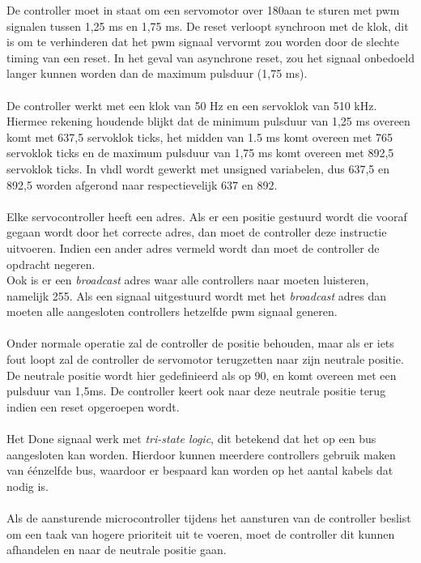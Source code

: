 De controller moet in staat om een servomotor over 180\textdegree  aan te sturen met \gls{pwm} signalen tussen 1,25 ms en 1,75 ms. De reset verloopt synchroon met de klok, dit is om te verhinderen dat het \gls{pwm} signaal vervormt zou worden door de slechte timing van een reset. In het geval van asynchrone reset, zou het  signaal onbedoeld langer kunnen worden dan de maximum pulsduur (1,75 ms).\\
\\
De controller werkt met een klok van 50 Hz en een servoklok van 510 kHz. Hiermee rekening houdende blijkt dat de minimum pulsduur van 1,25 ms overeen komt met 637,5 servoklok ticks, het midden van 1.5 ms komt overeen met 765 servoklok ticks en de maximum pulsduur van 1,75 ms komt overeen met 892,5 servoklok ticks. In \gls{vhdl} wordt gewerkt met unsigned variabelen, dus 637,5 en 892,5 worden afgerond naar respectievelijk 637 en 892.\\
\\
Elke servocontroller heeft een adres. Als er een positie gestuurd wordt die vooraf gegaan wordt door het correcte adres, dan moet de controller deze instructie uitvoeren. Indien een ander adres vermeld wordt dan moet de controller de opdracht negeren.\\
Ook is er een \textit{broadcast} adres waar alle controllers  naar moeten luisteren, namelijk 255. Als een signaal uitgestuurd wordt met het \textit{broadcast} adres dan moeten alle aangesloten controllers hetzelfde \gls{pwm} signaal generen.\\
\\
Onder normale operatie zal de controller de positie behouden, maar als er iets fout loopt zal de controller de servomotor terugzetten naar zijn neutrale positie. De neutrale positie wordt hier gedefinieerd als op 90\textdegree, en komt overeen met een pulsduur van 1,5ms. De controller keert ook naar deze neutrale positie terug indien een reset opgeroepen wordt.\\
\\
Het Done signaal werk met \textit{tri-state logic}, dit betekend dat het op een bus aangesloten kan worden. Hierdoor kunnen meerdere controllers gebruik maken van \'{e}\'{e}nzelfde bus, waardoor er bespaard kan worden op het aantal kabels dat nodig is.\\
\\
Als de aansturende microcontroller tijdens het aansturen van de controller beslist om een taak van hogere prioriteit uit te voeren, moet de controller dit kunnen afhandelen en naar de neutrale positie gaan.\\
